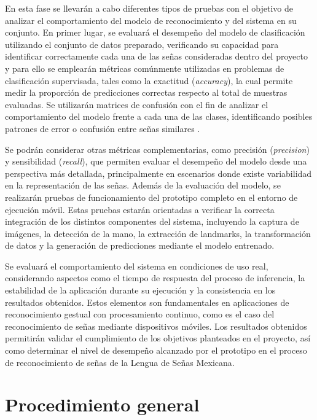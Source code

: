 	En esta fase se llevarán a cabo diferentes tipos de pruebas con el objetivo de
	analizar el comportamiento del modelo de reconocimiento y del sistema en su
	conjunto. En primer lugar, se evaluará el desempeño del modelo de clasificación
	utilizando el conjunto de datos preparado, verificando su capacidad para
	identificar correctamente cada una de las señas consideradas dentro del
	proyecto y para ello se emplearán métricas comúnmente utilizadas en problemas de
	clasificación supervisada, tales como la exactitud (\textit{accuracy}), la cual
	permite medir la proporción de predicciones correctas respecto al total de
	muestras evaluadas. Se utilizarán matrices de confusión con el
	fin de analizar el comportamiento del modelo frente a cada una de las clases,
	identificando posibles patrones de error o confusión entre señas similares
	\cite{geron2019,goodfellow2016}.
	
	Se podrán considerar otras métricas complementarias, como precisión
	(\textit{precision}) y sensibilidad (\textit{recall}), que permiten evaluar el
	desempeño del modelo desde una perspectiva más detallada, principalmente en
	escenarios donde existe variabilidad en la representación de las señas. Además de la evaluación del modelo, se realizarán pruebas de funcionamiento del
	prototipo completo en el entorno de ejecución móvil. Estas pruebas estarán
	orientadas a verificar la correcta integración de los distintos componentes del
	sistema, incluyendo la captura de imágenes, la detección de la mano, la
	extracción de landmarks, la transformación de datos y la generación de
	predicciones mediante el modelo entrenado.
	
	Se evaluará el comportamiento del sistema en condiciones de
	uso real, considerando aspectos como el tiempo de respuesta del proceso de
	inferencia, la estabilidad de la aplicación durante su ejecución y la
	consistencia en los resultados obtenidos. Estos elementos son fundamentales en
	aplicaciones de reconocimiento gestual con procesamiento continuo, como es el caso del
	reconocimiento de señas mediante dispositivos móviles. Los resultados obtenidos permitirán validar el cumplimiento de los
	objetivos planteados en el proyecto, así como determinar el nivel de desempeño
	alcanzado por el prototipo en el proceso de reconocimiento de señas de la Lengua
	de Señas Mexicana.
	
	\section{Procedimiento general}
	

